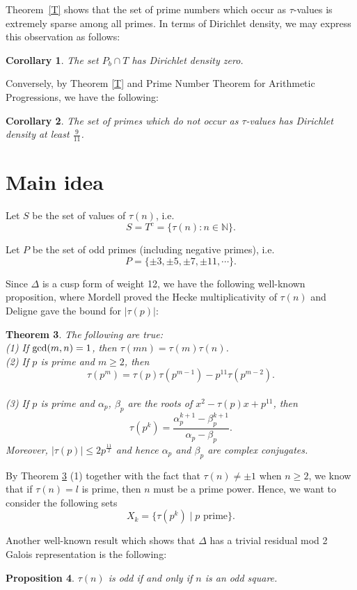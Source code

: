 \documentclass[12pt]{amsart}
\newtheorem{thm}{Theorem}[section]
\newtheorem{cor}[thm]{Corollary}
\newtheorem{prop}[thm]{Proposition}
\numberwithin{equation}{section}
\begin{document}
Theorem~\ref{T} shows that the set of prime numbers which occur as $\tau$-values is extremely sparse among all primes. In terms of Dirichlet density, we may express this observation as follows:

\begin{cor}\label{cordiri}
    The set $P_b \cap T$ has Dirichlet density zero.
\end{cor}
Conversely, by Theorem \ref{T} and Prime Number Theorem for Arithmetic Progressions, we have the following:
\begin{cor}
    The set of primes which do not occur as $\tau$-values has Dirichlet density at least $\frac{9}{11}$.
\end{cor}



\section{Main idea}
Let $S$ be the set of values of $\tau(n)$, i.e. $$S=T^c=\{\tau(n)\colon n\in\mathbb{N}\}.$$

Let $P$ be the set of odd primes (including negative primes), i.e.$$P=\{\pm3,\pm5,\pm7,\pm11,\cdots\}.$$

Since $\Delta$ is a cusp form of weight 12, we have the following well-known proposition, where  Mordell \cite{Mordell} proved the Hecke multiplicativity of $\tau(n)$ and Deligne \cite{Deligne1} \cite{Deligne2} gave the bound for $|\tau(p)|$: 
\begin{thm}\label{1}
    The following are true:\\
    (1) If $\textup{gcd}(m, n)=1$, then $\tau(mn)=\tau(m)\tau(n)$.\\
    (2) If $p$ is prime and $m \geq 2$, then $$\tau(p^m)=\tau(p)\tau(p^{m-1})-p^{11}\tau(p^{m-2}).$$\\
    (3) If $p$ is prime and $\alpha_p$, $\beta_p$ are the roots of $x^2-\tau(p)x+p^{11}$, then $$\tau(p^k)=\frac{\alpha_p^{k+1}-\beta_p^{k+1}}{\alpha_p-\beta_p}.$$
Moreover, $|\tau(p)|\leq 2p^{\frac{11}{2}}$ and hence $\alpha_p$ and $\beta_p$ are complex conjugates.
\end{thm}
By Theorem \ref{1} (1) together with the fact that $\tau(n)\neq\pm1$ when $n\geq 2$, we know that if $\tau(n)=l$ is prime, then $n$ must be a prime power. Hence, we want to consider the following sets $$X_k=\{\tau(p^k)\mid p\text{ prime}\}.$$

Another well-known result which shows that $\Delta$ has a trivial residual mod 2 Galois representation is the following: \begin{prop}\label{mod2}
    $\tau(n)$ is odd if and only if $n$ is an odd square.
\end{prop}
\end{document}
